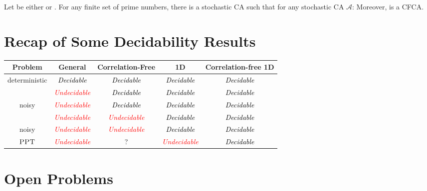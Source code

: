 \documentclass[submission]{fundam}
\newcommand{\PPT}{\ensuremath{\textsc{PPT}}}
\newcommand{\AUTO}[1]{{\ensuremath{\mathcal{#1}}}}
\newcommand\CAA{\AUTO A}
\newcommand\CFCA{\textsf{CFCA}}
\begin{document}
{\begin{theorem}\label{thm:stoc:univ}
  Let  be either  or . For any finite set  of prime numbers, there is a stochastic CA  such that for any stochastic CA \CAA: 
Moreover,   is a \CFCA.
\end{theorem}


\section{Recap of Some Decidability Results}

\newcommand\Ude{\textit{\textcolor{red}{Undecidable}}}
\newcommand\Dec{\textit{\textcolor{black}{Decidable}}}

\begin{center}
\begin{tabular}{ccccc}
\bfseries Problem  & \bfseries General & \bfseries Correlation-Free & \bfseries 1D & \bfseries Correlation-free 1D\\ \toprule
 deterministic & \Dec &  \Dec &  \Dec &  \Dec \\ 
 \midrule
 & \Ude & \Dec & \Dec & \Dec \\
 \midrule
  noisy & \Ude & \Dec & \Dec & \Dec \\
 \midrule
  & \Ude & \Ude & \Dec & \Dec \\
 \midrule
  noisy & \Ude & \Ude & \Dec & \Dec \\
 \midrule
\PPT{}
& \Ude & ? &  \Ude & \Dec \\
\bottomrule
\end{tabular}
\end{center}

\section{Open Problems}
\label{sec:open}


}
\end{document}
